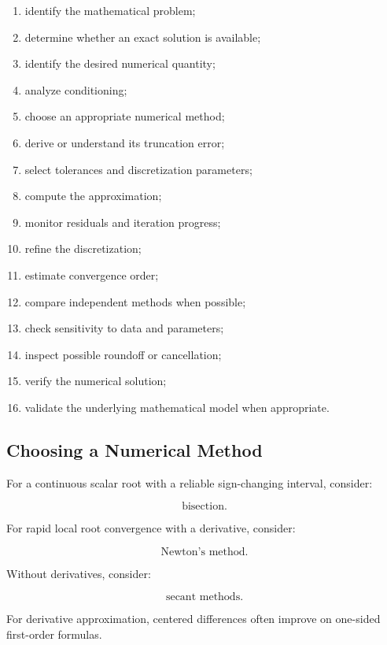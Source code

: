 \begin{enumerate}
    \item identify the mathematical problem;
    \item determine whether an exact solution is available;
    \item identify the desired numerical quantity;
    \item analyze conditioning;
    \item choose an appropriate numerical method;
    \item derive or understand its truncation error;
    \item select tolerances and discretization parameters;
    \item compute the approximation;
    \item monitor residuals and iteration progress;
    \item refine the discretization;
    \item estimate convergence order;
    \item compare independent methods when possible;
    \item check sensitivity to data and parameters;
    \item inspect possible roundoff or cancellation;
    \item verify the numerical solution;
    \item validate the underlying mathematical model when appropriate.
\end{enumerate}

\subsection{Choosing a Numerical Method}
\label{subsec:choosing-numerical-method}

For a continuous scalar root with a reliable sign-changing interval,
consider:

\[
\boxed{
\text{bisection}.
}
\]

For rapid local root convergence with a derivative, consider:

\[
\boxed{
\text{Newton's method}.
}
\]

Without derivatives, consider:

\[
\boxed{
\text{secant methods}.
}
\]

For derivative approximation, centered differences often improve on
one-sided first-order formulas.

